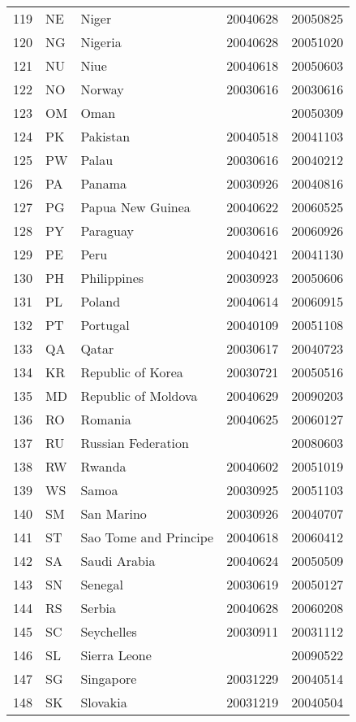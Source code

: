 \begin{longtable}{rllrr}
  119 & NE & Niger & 20040628 & 20050825 \\ 
  120 & NG & Nigeria & 20040628 & 20051020 \\ 
  121 & NU & Niue & 20040618 & 20050603 \\ 
  122 & NO & Norway & 20030616 & 20030616 \\ 
  123 & OM & Oman &  & 20050309 \\ 
  124 & PK & Pakistan & 20040518 & 20041103 \\ 
  125 & PW & Palau & 20030616 & 20040212 \\ 
  126 & PA & Panama & 20030926 & 20040816 \\ 
  127 & PG & Papua New Guinea & 20040622 & 20060525 \\ 
  128 & PY & Paraguay & 20030616 & 20060926 \\ 
  129 & PE & Peru & 20040421 & 20041130 \\ 
  130 & PH & Philippines & 20030923 & 20050606 \\ 
  131 & PL & Poland & 20040614 & 20060915 \\ 
  132 & PT & Portugal & 20040109 & 20051108 \\ 
  133 & QA & Qatar & 20030617 & 20040723 \\ 
  134 & KR & Republic of Korea & 20030721 & 20050516 \\ 
  135 & MD & Republic of Moldova & 20040629 & 20090203 \\ 
  136 & RO & Romania & 20040625 & 20060127 \\ 
  137 & RU & Russian Federation &  & 20080603 \\ 
  138 & RW & Rwanda & 20040602 & 20051019 \\ 
  139 & WS & Samoa & 20030925 & 20051103 \\ 
  140 & SM & San Marino & 20030926 & 20040707 \\ 
  141 & ST & Sao Tome and Principe & 20040618 & 20060412 \\ 
  142 & SA & Saudi Arabia & 20040624 & 20050509 \\ 
  143 & SN & Senegal & 20030619 & 20050127 \\ 
  144 & RS & Serbia & 20040628 & 20060208 \\ 
  145 & SC & Seychelles & 20030911 & 20031112 \\ 
  146 & SL & Sierra Leone &  & 20090522 \\ 
  147 & SG & Singapore & 20031229 & 20040514 \\ 
  148 & SK & Slovakia & 20031219 & 20040504 \\ 

\end{longtable}
